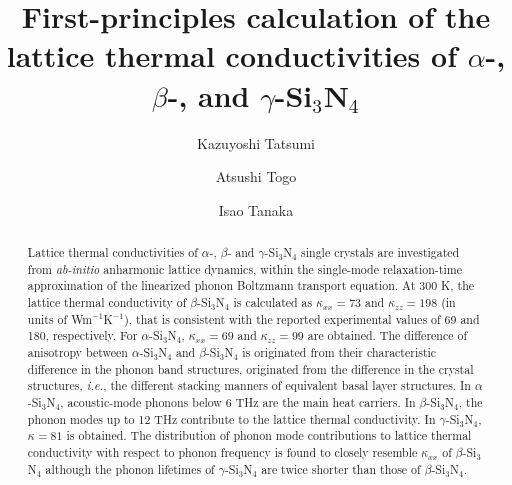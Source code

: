 \documentclass[twocolumn,amsmath,amssymb,a4paper,prb,superscriptaddress,floatfix]{revtex4-1}
\begin{document}
\title{First-principles calculation of the lattice thermal
conductivities of $\alpha$-, $\beta$-, and $\gamma$-Si$_3$N$_4$}

\author{Kazuyoshi Tatsumi} 

\author{Atsushi Togo}

\author{Isao Tanaka}

\begin{abstract}
Lattice thermal conductivities of $\alpha$-, $\beta$- and $\gamma$-Si$_3$N$_4$
single crystals are investigated from {\it ab-initio} anharmonic lattice
dynamics, within the single-mode relaxation-time approximation of the
linearized phonon Boltzmann transport equation. At 300 K, the lattice thermal
conductivity of $\beta$-Si$_3$N$_4$ is calculated as $\kappa_{xx}=73$ and
$\kappa_{zz}=198$ (in units of Wm$^{-1}$K$^{-1}$), that is consistent with the
reported experimental values of 69 and 180, respectively. For
$\alpha$-Si$_3$N$_4$, $\kappa_{xx}=69$ and $\kappa_{zz}=99$ are obtained.  The
difference of anisotropy between $\alpha$-Si$_3$N$_4$ and $\beta$-Si$_3$N$_4$
is originated from their characteristic difference in the phonon band
structures, originated from the difference in the crystal structures, {\it i.e.}, the
different stacking manners of equivalent basal layer structures.
In $\alpha$-Si$_3$N$_4$, acoustic-mode phonons below 6 THz are the
main heat carriers. In $\beta$-Si$_3$N$_4$, the phonon modes up to 12 THz
contribute to the lattice thermal conductivity. In $\gamma$-Si$_3$N$_4$,
$\kappa=81$ is obtained. The distribution of phonon mode contributions to
lattice thermal conductivity with respect to phonon frequency is found to
closely resemble $\kappa_{xx}$ of $\beta$-Si$_3$N$_4$ although the phonon
lifetimes of $\gamma$-Si$_3$N$_4$ are twice shorter than those of
$\beta$-Si$_3$N$_4$.
\end{abstract}
\end{document}
